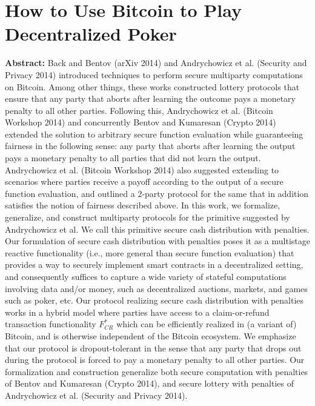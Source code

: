 \section{How to Use Bitcoin to Play Decentralized Poker }

\textbf{Abstract:} 
Back and Bentov (arXiv 2014) and Andrychowicz et al. (Security and Privacy 2014) introduced techniques to perform secure multiparty computations on Bitcoin. Among other things, these works constructed lottery protocols that ensure that any party that aborts after learning the outcome pays a monetary penalty to all other parties. Following this, Andrychowicz et al. (Bitcoin Workshop 2014) and concurrently Bentov and Kumaresan (Crypto 2014) extended the solution to arbitrary secure function
evaluation while guaranteeing fairness in the following sense: any party that aborts after learning the output pays a monetary penalty to all parties that did not learn the output. Andrychowicz et al. (Bitcoin Workshop 2014) also suggested extending to scenarios where parties receive a payoff according to the output of a secure function evaluation, and outlined a 2-party protocol for the same that in addition satisfies the notion of fairness described above. In this work, we formalize,
generalize, and construct multiparty protocols for the primitive suggested by Andrychowicz et al. We call this primitive secure cash distribution with penalties. Our formulation of secure cash distribution with penalties poses it as a multistage reactive functionality (i.e., more general than secure function evaluation) that provides a way to securely implement smart contracts in a decentralized setting, and consequently suffices to capture a wide variety of stateful computations involving data
and/or money, such as decentralized auctions, markets, and games such as poker, etc. Our protocol realizing secure cash distribution with penalties works in a hybrid model where parties have access to a claim-or-refund transaction functionality $F^{*}_{CR}$ which can be efficiently realized in (a variant of) Bitcoin, and is otherwise independent of the Bitcoin ecosystem. We emphasize that our protocol is dropout-tolerant in the sense that any party that drops out during the protocol is forced to pay a monetary penalty to all other parties. Our formalization and construction generalize both secure computation with penalties of Bentov and Kumaresan (Crypto 2014), and secure lottery with penalties of Andrychowicz et al. (Security and Privacy 2014).

